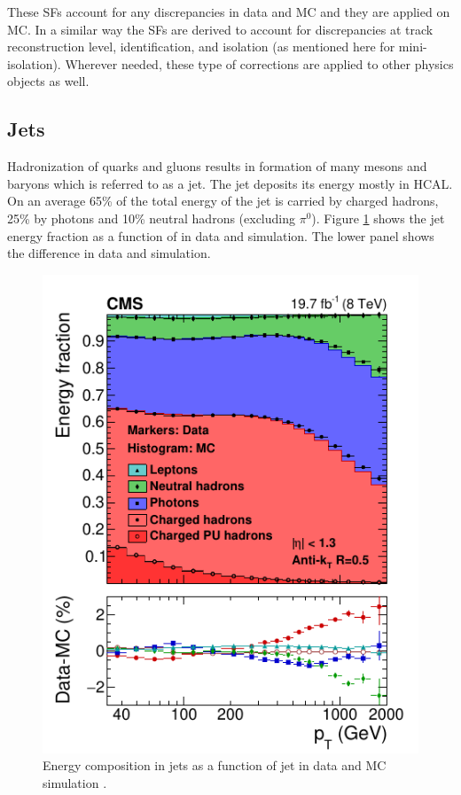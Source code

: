 These SFs account for any discrepancies in data and MC and they are applied on MC. In a similar way the SFs are derived to account for 
discrepancies at track reconstruction level, identification, and isolation (as mentioned here for mini-isolation). Wherever needed, these 
type of corrections are applied to other physics objects as well. 

 

\subsection{Jets}
Hadronization of quarks and gluons results in formation of many mesons and baryons which is referred to as a jet.
The jet deposits its energy mostly in HCAL. On an average 65\% of the total energy of the jet is carried by charged hadrons, 25\% by photons and 10\% neutral hadrons (excluding $\pi^{0}$). 
Figure \ref{fig:JetEfrac} shows the jet energy fraction as a function of \pt in data and simulation. The lower panel shows the difference 
in data and simulation.
\begin{figure}[h!]
\centering
\includegraphics[width=0.5\linewidth]{../Figures/Chap2/JetEfrac}
\caption[Energy energy composition]{Energy composition in jets as a function of jet \pt in data and MC simulation \cite{CMS-PRF-14-001}.}
\label{fig:JetEfrac}
\end{figure}

